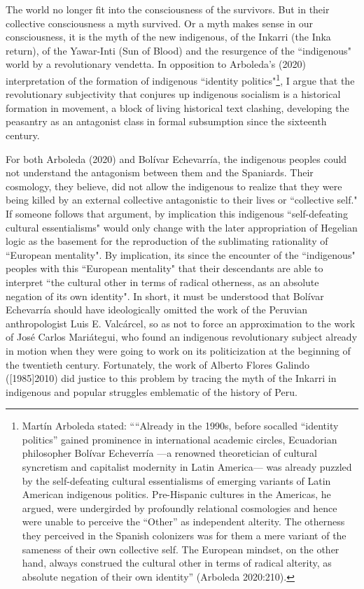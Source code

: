 \documentclass[]{interact}
\theoremstyle{plain}%
\theoremstyle{definition}
\theoremstyle{remark}
\begin{document}
The world no longer fit into the consciousness of the survivors. But in their collective consciousness a myth survived. Or a myth makes sense in our consciousness, it is the myth of the new indigenous, of the Inkarri (the Inka return), of the Yawar-Inti (Sun of Blood) and the resurgence of the “indigenous" world by a revolutionary vendetta. In opposition to Arboleda's (2020) interpretation of the formation of indigenous “identity politics"\footnote{Martín Arboleda stated: ““Already in the 1990s, before socalled “identity politics” gained prominence in international academic circles, Ecuadorian philosopher Bolívar Echeverría —a renowned theoretician of cultural syncretism and capitalist modernity in Latin America— was already puzzled by the self-defeating cultural essentialisms of emerging variants of Latin American indigenous politics. Pre-Hispanic cultures in the Americas, he argued, were undergirded by profoundly relational cosmologies and hence were unable to perceive the “Other” as independent alterity. The otherness they perceived in the Spanish colonizers was for them a mere variant of the sameness of their own collective self. The European mindset, on the other hand, always construed the cultural other in terms of radical alterity, as absolute negation of their own identity” (Arboleda 2020:210).}, I argue that the revolutionary subjectivity that conjures up indigenous socialism is a historical formation in movement, a block of living historical text clashing, developing the peasantry as an antagonist class in formal subsumption since the sixteenth century. 

For both Arboleda (2020) and Bolívar Echevarría, the indigenous peoples could not understand the antagonism between them and the Spaniards. Their cosmology, they believe, did not allow the indigenous to realize that they were being killed by an external collective antagonistic to their lives or “collective self." If someone follows that argument, by implication this indigenous “self-defeating cultural essentialisms" would only change with the later appropriation of Hegelian logic as the basement for the reproduction of the sublimating rationality of “European mentality". By implication, its since the encounter of the “indigenous" peoples with this “European mentality" that their descendants are able to interpret “the cultural other in terms of radical otherness, as an absolute negation of its own identity". In short, it must be understood that Bolívar Echevarría should have ideologically omitted the work of the Peruvian anthropologist Luis E. Valcárcel, so as not to force an approximation to the work of José Carlos Mariátegui, who found an indigenous revolutionary subject already in motion when they were going to work on its politicization at the beginning of the twentieth century. Fortunately, the work of Alberto Flores Galindo ([1985]2010) did justice to this problem by tracing the myth of the Inkarri in indigenous and popular struggles emblematic of the history of Peru. 
\end{document}

